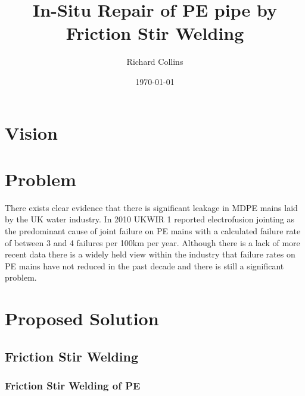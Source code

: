 \documentclass[]{article}
\date{\today}
\title{In-Situ Repair of PE pipe by Friction Stir Welding}
\author{Richard Collins}
\begin{document}
\maketitle
\section{Vision}


\section{Problem}

There exists clear evidence that there is significant leakage in MDPE mains laid 
by the UK water industry. In 2010 UKWIR 1 reported electrofusion jointing as 
the predominant cause of joint failure on PE mains with a calculated failure 
rate of between 3 and 4 failures per 100km per year. Although there is a lack 
of more recent data there is a widely held view within the industry that 
failure rates on PE mains have not reduced in the past decade and there is still
a significant problem.


\section{Proposed Solution}

\subsection{Friction Stir Welding}
\subsubsection{Friction Stir Welding of PE}
\end{document}
